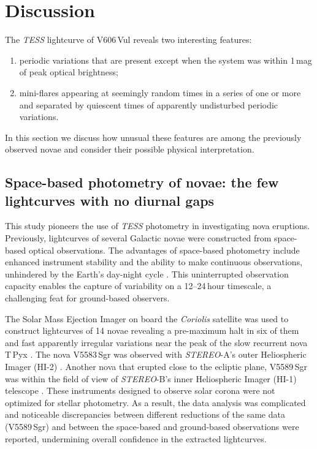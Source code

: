 \documentclass[twocolumn]{aastex631}
\newcommand{\nova}{V606\,Vul}
\begin{document}
\section{Discussion}
\label{sec:discussion}

The {\em TESS} lightcurve of \nova{} reveals two interesting features:
\begin{enumerate}
\item periodic variations that are present except when the system was within 1\,mag of peak optical brightness;
\item mini-flares appearing at seemingly random times in 
a series of one or more and separated by quiescent times of apparently
undisturbed periodic variations.
\end{enumerate}
In this section we discuss how unusual these features are among the
previously observed novae and consider their possible physical interpretation.


\subsection{Space-based photometry of novae: the few lightcurves with no diurnal gaps}

This study pioneers the use of {\em TESS} photometry in investigating nova eruptions.
Previously, lightcurves of several Galactic novae were constructed from space-based optical observations. 
The advantages of space-based photometry include enhanced instrument stability 
and the ability to make continuous observations, unhindered by the Earth's day-night cycle \citep{2021Univ....7..199W}. 
This uninterrupted observation capacity enables the capture of variability on a
12--24\,hour timescale, a challenging feat for ground-based observers.

The Solar Mass Ejection Imager on board the {\em Coriolis} satellite was 
used to construct lightcurves of 14 novae 
revealing a pre-maximum halt in six of them and fast apparently irregular variations near 
the peak of the slow recurrent nova T\,Pyx 
\citep{2010ApJ...724..480H,2014AJ....147..107S,2016ApJ...820..104H}.
The nova V5583\,Sgr was observed with {\em STEREO}-A's outer Heliospheric Imager (HI-2) 
\citep{2014MNRAS.438.3483H}. Another nova that erupted close to the ecliptic
plane, V5589\,Sgr was within the field of view of {\em STEREO}-B's inner Heliospheric Imager (HI-1) telescope
\citep{2017MNRAS.467.2684E,2017MNRAS.470.4061T}.
These instruments designed to observe solar corona were not optimized for stellar photometry. 
As a result, the data analysis was complicated and noticeable discrepancies 
between different reductions of the same data (V5589\,Sgr) and between 
the space-based and ground-based observations were reported, undermining
overall confidence in the extracted lightcurves.
\end{document}
